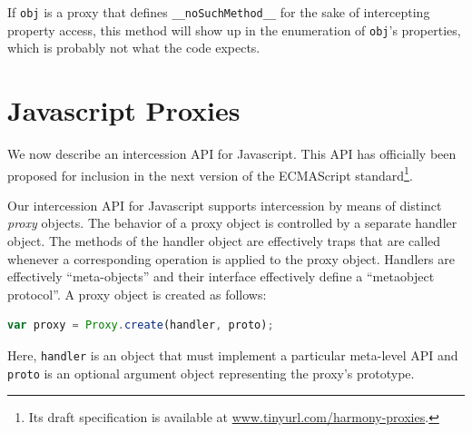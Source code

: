 \documentclass{sig-alternate}
\newcommand{\noSuchMethod}{\texttt{\_\_noSuchMethod\_\_}}
\begin{document}
If \texttt{obj} is a proxy that defines \noSuchMethod{} for the sake of intercepting property access, this method will show up in the enumeration of \texttt{obj}'s properties, which is probably not what the code expects.


\section{Javascript Proxies}
\label{sec:proxies_for_javascript}

We now describe an intercession API for Javascript. This API has officially been proposed for inclusion in the next version of the ECMAScript standard\footnote{Its draft specification is available at \url{www.tinyurl.com/harmony-proxies}.}.

Our intercession API for Javascript supports intercession by means of distinct \emph{proxy} objects. The behavior of a proxy object is controlled by a separate handler object. The methods of the handler object are effectively traps that are called whenever a corresponding operation is applied to the proxy object. Handlers are effectively ``meta-objects'' and their interface effectively define a ``metaobject protocol''. A proxy object is created as follows:

\begin{lstlisting}[language=javascript]
var proxy = Proxy.create(handler, proto);
\end{lstlisting}

Here, \texttt{handler} is an object that must implement a particular meta-level API and \texttt{proto} is an optional argument object representing the proxy's prototype.
\end{document}
